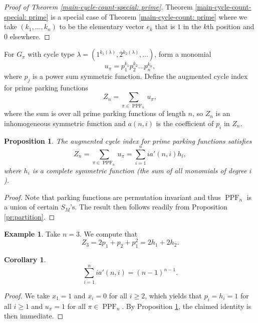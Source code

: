\documentclass[letterpaper]{amsart}
\theoremstyle{plain}
\newtheorem{proposition}[theorem]{Proposition}
\newtheorem{corollary}[theorem]{Corollary}
\theoremstyle{definition}
\newtheorem{example}[theorem]{Example}
\theoremstyle{remark}
\DeclareMathOperator{\PPF}{PPF}
\begin{document}
\begin{proof}[Proof of Theorem \ref{main-cycle-count-special: prime}]
Theorem \ref{main-cycle-count-special: prime} is a special case of Theorem \ref{main-cycle-count: prime} where we take $(k_1, \dots, k_n)$ to be the elementary vector $e_k$ that is $1$ in the $k$th position and $0$ elsewhere.
\end{proof}

For $G_\pi$ with cycle type $\lambda=(1^{k_1(\lambda)}, 2^{k_2(\lambda)}, \dots)$, form a monomial \[u_\pi=p_1^{k_1} p_2^{k_2} \dots p_n^{k_n},\]
where $p_j$ is a power sum symmetric function. Define the augmented cycle index for prime parking functions
\begin{equation*}
Z_n=\sum_{\pi \in \PPF_n} u_\pi,
\end{equation*}
where the sum is over all prime parking functions of length $n$, so $Z_n$ is an inhomogeneous symmetric function and $a(n,i)$ is the coefficient of $p_i$ in $Z_n$.

\begin{proposition}\label{pr:parking-augmented: prime}
The augmented cycle index for prime parking functions satisfies
\[Z_n=\sum_{\pi \in \PPF_n} u_\pi=\sum_{i=1}^n i a'(n,i) h_i,\]
where $h_i$ is a complete symmetric function (the sum of all monomials of degree $i$).
\end{proposition}

\begin{proof}
Note that parking functions are permutation invariant and thus $\PPF_n$ is a union of certain $S_M$'s. The result then follows readily from Proposition \ref{pr:partition}.
\end{proof}

\begin{example}
Take $n=3$. We compute that
\[Z_3=2p_1 +p_2+p_1^2=2h_1+2h_2.\]
\end{example}

\begin{corollary}
\begin{equation*}
\sum_{i=1}^n i a'(n,i) = (n-1)^{n-1}.
\end{equation*}
\end{corollary}

\begin{proof}
We take $x_1=1$ and $x_i=0$ for all $i\geq 2$, which yields that $p_i=h_i=1$ for all $i \geq 1$ and $u_\pi=1$ for all $\pi \in \PPF_n$. By Proposition \ref{pr:parking-augmented: prime}, the claimed identity is then immediate.
\end{proof}
\end{document}
